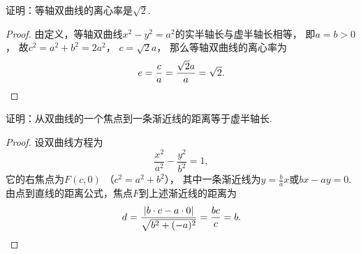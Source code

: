 \begin{example}
证明：等轴双曲线的离心率是\(\sqrt2\).
\begin{proof}
由定义，等轴双曲线\(x^2-y^2=a^2\)的实半轴长与虚半轴长相等，
即\(a=b>0\)，
故\(c^2 = a^2 + b^2 = 2 a^2\)，
\(c = \sqrt2 a\)，
那么等轴双曲线的离心率为\begin{equation*}
	e = \frac{c}{a} = \frac{\sqrt2 a}{a} = \sqrt2.
	\qedhere
\end{equation*}
\end{proof}
\end{example}

\begin{example}
证明：从双曲线的一个焦点到一条渐近线的距离等于虚半轴长.
\begin{proof}
设双曲线方程为\begin{equation*}
	\frac{x^2}{a^2}-\frac{y^2}{b^2}=1,
\end{equation*}
它的右焦点为\(F(c,0)\)
（\(c^2=a^2+b^2\)），
其中一条渐近线为\(y=\frac{b}{a}x\)或\(bx-ay=0\).
由点到直线的距离公式，焦点\(F\)到上述渐近线的距离为\begin{equation*}
	d = \frac{\abs{b \cdot c - a \cdot 0}}{\sqrt{b^2+(-a)^2}}
	= \frac{bc}{c} = b.
	\qedhere
\end{equation*}
\end{proof}
\end{example}

